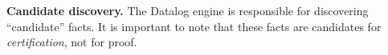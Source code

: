 
\textbf{Candidate discovery.} The Datalog engine is responsible for discovering ``candidate'' facts. It is important to note that these facts are candidates for \emph{certification}, not for proof.

